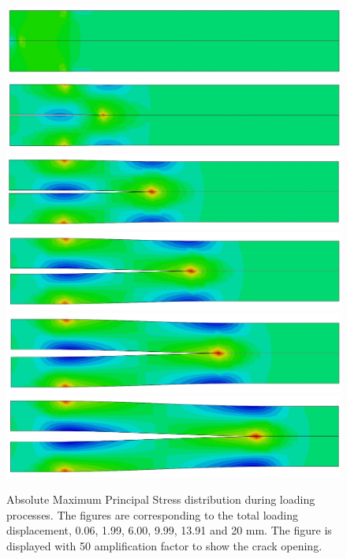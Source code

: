 \documentclass[preprint,review,12pt]{elsarticle}
\begin{document}
\begin{figure}[htbp]
\begin{minipage}[t]{0.28\textwidth}
\end{minipage}
\begin{minipage}[t]{0.65\textwidth}
\centering
\includegraphics[width=\textwidth]{Abaqus/CZM/CZM_1.jpg}
\includegraphics[width=\textwidth]{Abaqus/CZM/CZM_2.jpg}
\includegraphics[width=\textwidth]{Abaqus/CZM/CZM_3.jpg}
\includegraphics[width=\textwidth]{Abaqus/CZM/CZM_4.jpg}
\includegraphics[width=\textwidth]{Abaqus/CZM/CZM_5.jpg}
\includegraphics[width=\textwidth]{Abaqus/CZM/CZM_6.jpg}
\end{minipage}
\caption{Absolute Maximum Principal Stress distribution during loading processes. The figures are corresponding to the total loading displacement, 0.06, 1.99, 6.00, 9.99, 13.91 and 20 mm. The figure is displayed with 50 amplification factor to show the crack opening.}
\label{fig:CZMResults}
\end{figure}
\end{document}
